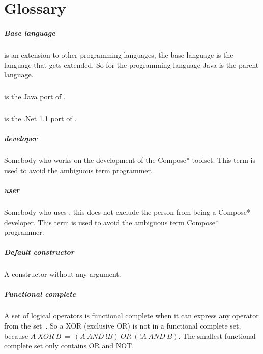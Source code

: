 \chapter{Glossary}

\paragraph{Base language} \Compose* is an extension to other programming languages, the base language is the language
that gets extended. So for \Compose*[Java] the programming language Java is the parent language.

\paragraph{\Compose*[Java]} \Compose*[Java] is the Java port of \Compose*.

\paragraph{\Compose*[DotNET]} \Compose*[Net] is the .Net 1.1 port of \Compose*.

\paragraph{\Compose*{} developer} Somebody who works on the development of the Compose* toolset.
This term is used to avoid the ambiguous term \Compose* programmer.

\paragraph{\Compose*{} user} Somebody who uses \Compose*, this does not exclude the
person from being a Compose* developer. This term is used to avoid the ambiguous term Compose* programmer.

\paragraph{Default constructor} A constructor without any argument.

\paragraph{Functional complete} A set of logical operators is functional complete when it can express any operator from
the set~\cite{vanBenthem91}.
So a XOR (exclusive OR) is not in a functional complete set, because $A~XOR~B~=~(A~AND~!B)~OR~(!A~AND~B)$. 
The smallest functional complete set only contains OR and NOT.

